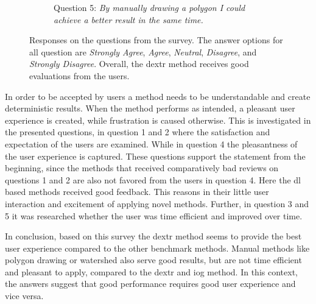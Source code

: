 \begin{figure} [h!]
\begin{subfigure}[t]{0.48\textwidth}
		\caption{
			Question 5: \textit{By manually drawing a polygon I could achieve a better result in the same time.}
		} \label{fig:ch5:sec4:q5}
	\end{subfigure}
	\caption [Watershed User Interaction]{
		Responses on the questions from the survey.
		The answer options for all question are \textit{Strongly Agree}, \textit{Agree}, \textit{Neutral}, \textit{Disagree}, and \textit{Strongly Disagree}.
		Overall, the \gls{dextr} method receives good evaluations from the users.
	} \label{fig:ch5:sec4:suvery}
\end{figure}

In order to be accepted by users a method needs to be understandable and create deterministic results.
When the method performs as intended, a pleasant user experience is created, while frustration is caused otherwise.
This is investigated in the presented questions, in question 1 and 2 where the satisfaction and expectation of the users are examined.
While in question 4 the pleasantness of the user experience is captured.
These questions support the statement from the beginning, since the methods that received comparatively bad reviews on questions 1 and 2 are also not favored from the users in question 4.
Here the \gls{dl} based methods received good feedback.
This reasons in their little user interaction and excitement of applying novel methods.
Further, in question 3 and 5 it was researched whether the user was time efficient and improved over time.

In conclusion, based on this survey the \gls{dextr} method seems to provide the best user experience compared to the other benchmark methods.
Manual methods like polygon drawing or watershed also serve good results, but are not time efficient and pleasant to apply, compared to the \gls{dextr} and \gls{iog} method.
In this context, the answers suggest that good performance requires good user experience and vice versa.

